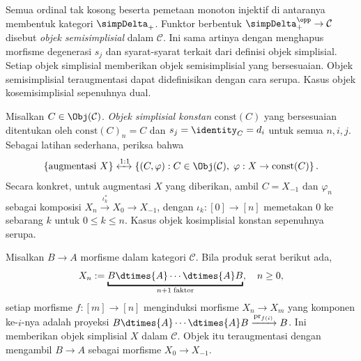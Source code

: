 \begin{remark}\label{rem:semisimplicial}
	Semua ordinal tak kosong beserta pemetaan monoton injektif di antaranya
	membentuk kategori $\simpDelta_+$. Funktor berbentuk
	$\simpDelta_+^{\opp}\to\mathcal{C}$ disebut \emph{objek semisimplisial}
	dalam $\mathcal{C}$. Ini sama artinya dengan menghapus morfisme degenerasi
	$s_j$ dan syarat-syarat terkait dari definisi objek simplisial. Setiap
	objek simplisial memberikan objek semisimplisial yang bersesuaian. Objek
	semisimplisial teraugmentasi dapat didefinisikan dengan cara serupa. Kasus
	objek kosemisimplisial sepenuhnya dual.
\end{remark}

\begin{example}\label{eg:const-simplicial}
	Misalkan $C\in\Obj(\mathcal{C})$. \emph{Objek simplisial konstan}
	$\mathrm{const}(C)$ yang bersesuaian ditentukan oleh
	$\mathrm{const}(C)_n=C$ dan $s_j=\identity_C=d_i$ untuk semua $n,i,j$.
	Sebagai latihan sederhana, periksa bahwa
	\[ \left\{ \text{augmentasi }X\right\} \xleftrightarrow{1:1} \left\{ (C, \varphi): C \in \Obj(\mathcal{C}), \; \varphi: X \to \mathrm{const}(C)  \right\}. \]
	Secara konkret, untuk augmentasi $X$ yang diberikan, ambil $C=X_{-1}$ dan
	$\varphi_n$ sebagai komposisi
	$X_n\xrightarrow{\iota_k^*}X_0\to X_{-1}$, dengan
	$\iota_k:[0]\to[n]$ memetakan $0$ ke sebarang $k$ untuk
	$0\leq k\leq n$. Kasus objek kosimplisial konstan sepenuhnya serupa.
\end{example}

\begin{example}
	Misalkan $B\to A$ morfisme dalam kategori $\mathcal{C}$. Bila produk
	serat berikut ada,
	\[ X_n := \underbracket{B \dtimes{A} \cdots \dtimes{A} B}_{n+1 \;\text{faktor}}, \quad n \geq 0, \]
	setiap morfisme $f:[m]\to[n]$ menginduksi morfisme $X_n\to X_m$ yang
	komponen ke-$i$-nya adalah proyeksi
	$B\dtimes{A}\cdots\dtimes{A}B\xrightarrow{\mathrm{pr}_{f(i)}}B$. Ini
	memberikan objek simplisial $X$ dalam $\mathcal{C}$. Objek itu
	teraugmentasi dengan mengambil $B\to A$ sebagai morfisme
	$X_0\to X_{-1}$.
\end{example}

